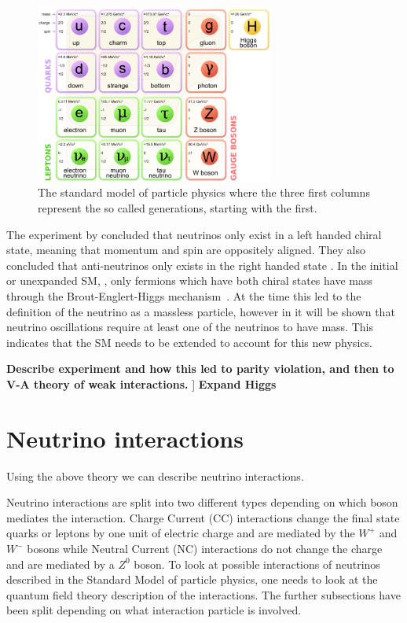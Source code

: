 \begin{figure}[h!]
\includegraphics[width=0.7\textwidth]{figures/Standard_Model_of_Elementary_Particles.png}
\caption{The standard model of particle physics where the three first columns represent the so called generations, starting with the first. \cite{33wiki1:Online}}
\label{fig:standardModel}
\end{figure}

The experiment by \citeauthor{1Helicity} concluded that neutrinos only exist in a left handed chiral state, meaning that momentum and spin are oppositely aligned. They also concluded that anti-neutrinos only exists in the right handed state \cite{1Helicity}. In the initial or unexpanded SM, \cite{34doi:10.1142/9789812562203_0002}, only fermions which have both chiral states have mass through the Brout\hyp{}Englert\hyp{}Higgs mechanism~\cite{35Higgs}. At the time this led to the definition of the neutrino as a massless particle, however in  it will be shown that neutrino oscillations require at least one of the neutrinos to have mass. This indicates that the SM needs to be extended to account for this new physics.

\textbf{Describe experiment and how this led to parity violation, and then to V-A theory of weak interactions.} ]
\textbf{Expand Higgs}

\section{Neutrino interactions}\label{subsection:Neutrino interactions}
Using the above theory we can describe neutrino interactions.

Neutrino interactions are split into two different types depending on which boson mediates the interaction.
Charge Current (CC) interactions change the final state quarks or leptons by one unit of electric charge and are mediated by the $W^+$ and $W^-$ bosons while Neutral Current (NC) interactions do not change the charge and are mediated by a $Z^0$ boson. 
To look at possible interactions of neutrinos described in the Standard Model of particle physics, one needs to look at the quantum field theory description of the interactions\cite{3Peskin, 2Hallsjo}.  The further subsections have been split depending on what interaction particle is involved.

